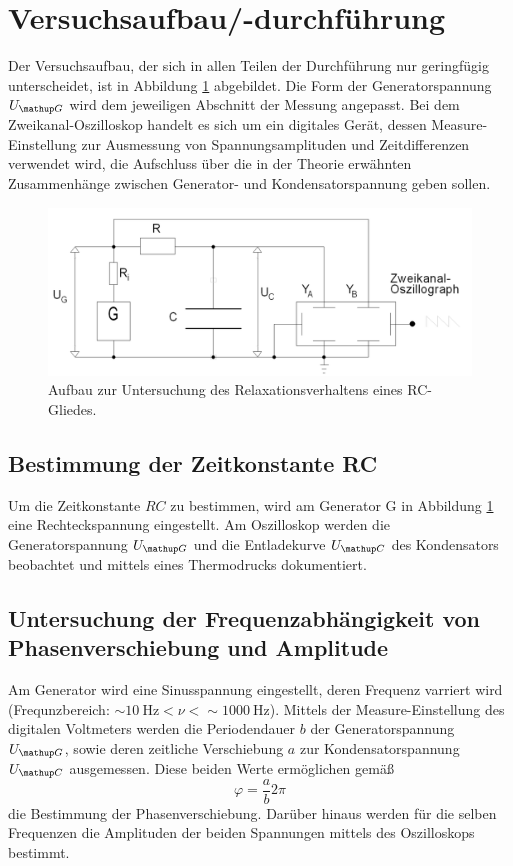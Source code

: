 \section{Versuchsaufbau/-durchführung}
Der Versuchsaufbau, der sich in allen Teilen der Durchführung nur geringfügig unterscheidet, ist in Abbildung \ref{fig: aufbau} abgebildet.
Die Form der Generatorspannung $U\ua{G}$ wird dem jeweiligen Abschnitt der Messung angepasst. Bei dem Zweikanal-Oszilloskop handelt es sich um ein
digitales Gerät, dessen Measure-Einstellung zur Ausmessung von Spannungsamplituden und Zeitdifferenzen verwendet wird, die Aufschluss über
die in der Theorie erwähnten Zusammenhänge zwischen Generator- und Kondensatorspannung geben sollen.
\begin{figure}
  \centering
  \includegraphics[width = \textwidth]{pics/aufbau.png}
  \caption{Aufbau zur Untersuchung des Relaxationsverhaltens eines RC-Gliedes.}
  \label{fig: aufbau}
\end{figure}

\subsection{Bestimmung der Zeitkonstante RC}
Um die Zeitkonstante $RC$ zu bestimmen, wird am Generator G in Abbildung \ref{fig: aufbau} eine Rechteckspannung eingestellt.
Am Oszilloskop werden die Generatorspannung $U\ua{G}$ und die Entladekurve $U\ua{C}$ des Kondensators beobachtet und mittels eines Thermodrucks
dokumentiert.

\subsection{Untersuchung der Frequenzabhängigkeit von Phasenverschiebung und Amplitude}
Am Generator wird eine Sinusspannung eingestellt, deren Frequenz varriert wird (Frequnzbereich: $\sim\SI{10}{\hertz}<\nu< \sim\SI{1000}{\hertz}$).
Mittels der Measure-Einstellung des digitalen Voltmeters werden die Periodendauer $b$ der
Generatorspannung $U\ua{G}$, sowie deren zeitliche Verschiebung $a$ zur Kondensatorspannung $U\ua{C}$ ausgemessen. Diese beiden Werte ermöglichen gemäß
\begin{equation}
  \varphi = \frac{a}{b}2\pi
  \label{eq:phasenverschiebung}
\end{equation}
die Bestimmung der Phasenverschiebung. Darüber hinaus werden für die selben Frequenzen die Amplituden der beiden Spannungen mittels des Oszilloskops
bestimmt. 

